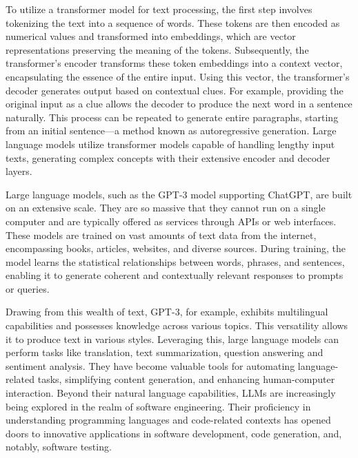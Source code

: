 To utilize a transformer model for text processing, the first step involves tokenizing the text into a sequence of words. These tokens are then encoded as numerical values and transformed into embeddings, which are vector representations preserving the meaning of the tokens. Subsequently, the transformer's encoder transforms these token embeddings into a context vector, encapsulating the essence of the entire input. Using this vector, the transformer's decoder generates output based on contextual clues. For example, providing the original input as a clue allows the decoder to produce the next word in a sentence naturally. This process can be repeated to generate entire paragraphs, starting from an initial sentence—a method known as autoregressive generation. Large language models utilize transformer models capable of handling lengthy input texts, generating complex concepts with their extensive encoder and decoder layers.

Large language models, such as the GPT-3 model supporting ChatGPT, are built on an extensive scale. They are so massive that they cannot run on a single computer and are typically offered as services through APIs or web interfaces. These models are trained on vast amounts of text data from the internet, encompassing books, articles, websites, and diverse sources. During training, the model learns the statistical relationships between words, phrases, and sentences, enabling it to generate coherent and contextually relevant responses to prompts or queries.

Drawing from this wealth of text, GPT-3, for example, exhibits multilingual capabilities and possesses knowledge across various topics. This versatility allows it to produce text in various styles. Leveraging this, large language models can perform tasks like translation, text summarization, question answering and sentiment analysis. They have become valuable tools for automating language-related tasks, simplifying content generation, and enhancing human-computer interaction. Beyond their natural language capabilities, LLMs are increasingly being explored in the realm of software engineering. Their proficiency in understanding programming languages and code-related contexts has opened doors to innovative applications in software development, code generation, and, notably, software testing.

